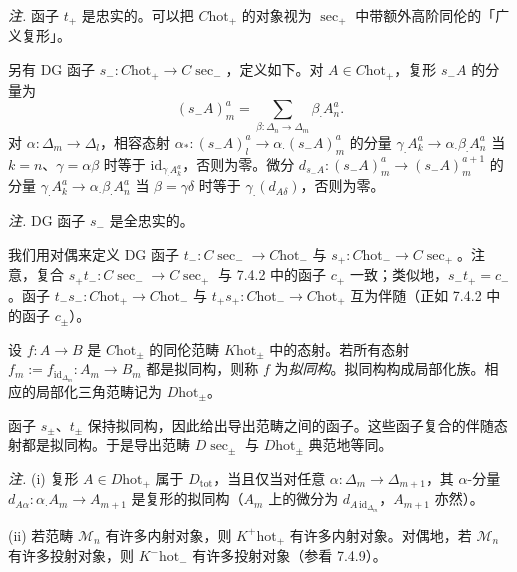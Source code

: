 \emph{注.} 函子 $t_{+}$ 是忠实的。可以把 $C\mathrm{hot}_{+}$ 的对象视为 $\sec_{+}$ 中带额外高阶同伦的「广义复形」。

另有 DG 函子 $s_{-}:C\mathrm{hot}_{+}\to C\sec_{-}$，定义如下。对 $A\in C\mathrm{hot}_{+}$，复形 $s_{-}A$ 的分量为
\[
(s_{-}A)^{a}_{m}=\sum_{\beta:\Delta_{n}\to\Delta_{m}}\beta_{\cdot}A^{a}_{n}.
\]
对 $\alpha:\Delta_{m}\to\Delta_{l}$，相容态射 $\alpha_{*}:(s_{-}A)^{a}_{l}\to\alpha_{\cdot}(s_{-}A)^{a}_{m}$ 的分量 $\gamma_{\cdot}A^{a}_{k}\to\alpha_{\cdot}\beta_{\cdot}A^{a}_{n}$ 当 $k=n$、$\gamma=\alpha\beta$ 时等于 $\mathrm{id}_{\gamma_{\cdot}A^{a}_{k}}$，否则为零。微分 $d_{s_{-}A}:(s_{-}A)^{a}_{m}\to(s_{-}A)^{a+1}_{m}$ 的分量 $\gamma_{\cdot}A^{a}_{k}\to\alpha_{\cdot}\beta_{\cdot}A^{a}_{n}$ 当 $\beta=\gamma\delta$ 时等于 $\gamma_{\cdot}(d_{A\delta})$，否则为零。

\emph{注.} DG 函子 $s_{-}$ 是全忠实的。


我们用对偶来定义 DG 函子 $t_{-}:C\sec_{-}\to C\mathrm{hot}_{-}$ 与 $s_{+}:C\mathrm{hot}_{-}\to C\sec_{+}$。注意，复合 $s_{+}t_{-}:C\sec_{-}\to C\sec_{+}$ 与 7.4.2 中的函子 $c_{+}$ 一致；类似地，$s_{-}t_{+}=c_{-}$。函子 $t_{-}s_{-}:C\mathrm{hot}_{+}\to C\mathrm{hot}_{-}$ 与 $t_{+}s_{+}:C\mathrm{hot}_{-}\to C\mathrm{hot}_{+}$ 互为伴随（正如 7.4.2 中的函子 $c_{\pm}$）。

设 $f:A\to B$ 是 $C\mathrm{hot}_{\pm}$ 的同伦范畴 $K\mathrm{hot}_{\pm}$ 中的态射。若所有态射 $f_{m}:=f_{\mathrm{id}_{\Delta_{m}}}:A_{m}\to B_{m}$ 都是拟同构，则称 $f$ 为\emph{拟同构}。拟同构构成局部化族。相应的局部化三角范畴记为 $D\mathrm{hot}_{\pm}$。

函子 $s_{\pm}$、$t_{\pm}$ 保持拟同构，因此给出导出范畴之间的函子。这些函子复合的伴随态射都是拟同构。于是导出范畴 $D\sec_{\pm}$ 与 $D\mathrm{hot}_{\pm}$ 典范地等同。


\emph{注.} (i) 复形 $A\in D\mathrm{hot}_{+}$ 属于 $D_{\mathrm{tot}}$，当且仅当对任意 $\alpha:\Delta_{m}\to\Delta_{m+1}$，其 $\alpha$-分量 $d_{A\alpha}:\alpha_{\cdot}A_{m}\to A_{m+1}$ 是复形的拟同构（$A_{m}$ 上的微分为 $d_{A\,\mathrm{id}_{\Delta_{m}}}$，$A_{m+1}$ 亦然）。

(ii) 若范畴 $\mathcal{M}_{n}$ 有许多内射对象，则 $K^{+}\mathrm{hot}_{+}$ 有许多内射对象。对偶地，若 $\mathcal{M}_{n}$ 有许多投射对象，则 $K^{-}\mathrm{hot}_{-}$ 有许多投射对象（参看 7.4.9）。

